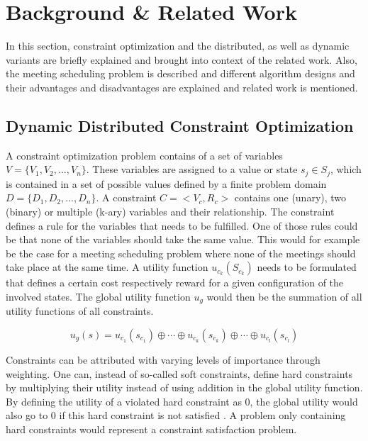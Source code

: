\chapter{Background \& Related Work}
\label{chap:background}

In this section, constraint optimization and the distributed, as well as dynamic variants are briefly explained and brought into context of the related work. Also, the meeting scheduling problem is described and different algorithm designs and their advantages and disadvantages are explained and related work is mentioned.
    
\section{Dynamic Distributed Constraint Optimization}

    
A constraint optimization problem contains of a set of variables \(V=\{V_{1},V_{2}, ...,  V_{n}\}\). These variables are assigned to a value or state \(s_{j} \in S_{j}\), which is contained in a set of possible values defined by a finite problem domain \(D=\{D_{1},D_{2}, ...,  D_{n}\}\). A constraint \(C = <V_{c}, R_{c}>\) contains one (unary), two (binary) or multiple (k-ary) variables and their relationship. The constraint defines a rule for the variables that needs to be fulfilled. One of those rules could be that none of the variables should take the same value. This would for example be the case for a meeting scheduling problem where none of the meetings should take place at the same time. \newline
A utility function \(u_{{c}_{k}}(S_{{c}_{k}})\) needs to be formulated that defines a certain cost respectively reward for a given configuration of the involved states. The global utility function \(u_{g}\) would then be the summation of all utility functions of all constraints. 

\[u_{g}(s) = u_{c_{1}}(s_{c_{1}}) \oplus \cdots \oplus u_{c_{k}}(s_{c_{k}}) \oplus \cdots \oplus u_{c_{l}}(s_{c_{l}}) \] 

Constraints can be attributed with varying levels of importance through weighting. One can, instead of so-called soft constraints, define hard constraints by multiplying their utility instead of using addition in the global utility function. By defining the utility of a violated hard constraint as 0, the global utility would also go to 0 if this hard constraint is not satisfied \cite{Chapman2011, Petcu2003}. A problem only containing hard constraints would represent a constraint satisfaction problem.


